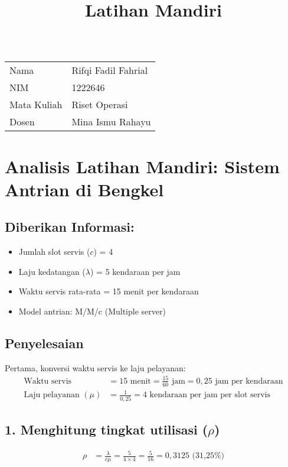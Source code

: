 \documentclass{article}
\title{Latihan Mandiri}
\author{}
\date{}
\begin{document}
\maketitle
\begin{table}[ht]
  \caption{}\label{tab:}
    \begin{tabular}[l]{ll}
      Nama & Rifqi Fadil Fahrial \\
      NIM & 1222646 \\
      Mata Kuliah & Riset Operasi\\ 
      Dosen & Mina Ismu Rahayu \\
    \end{tabular}
\end{table}

\section*{Analisis Latihan Mandiri: Sistem Antrian di Bengkel}
\subsection*{Diberikan Informasi:}
\begin{itemize}
\item Jumlah slot servis ($c$) = 4
\item Laju kedatangan ($\lambda$) = 5 kendaraan per jam
\item Waktu servis rata-rata = 15 menit per kendaraan
\item Model antrian: M/M/c (Multiple server)
\end{itemize}
\subsection*{Penyelesaian}
Pertama, konversi waktu servis ke laju pelayanan:
\begin{align}
\text{Waktu servis} &= 15 \text{ menit} = \frac{15}{60} \text{ jam} = 0,25 \text{ jam per kendaraan} \\
\text{Laju pelayanan } (\mu) &= \frac{1}{0,25} = 4 \text{ kendaraan per jam per slot servis}
\end{align}
\subsection*{1. Menghitung tingkat utilisasi ($\rho$)}
\begin{align}
\rho &= \frac{\lambda}{c\mu} = \frac{5}{4 \times 4} = \frac{5}{16} = 0,3125 \text{ (31,25\%)}
\end{align}
\end{document}

